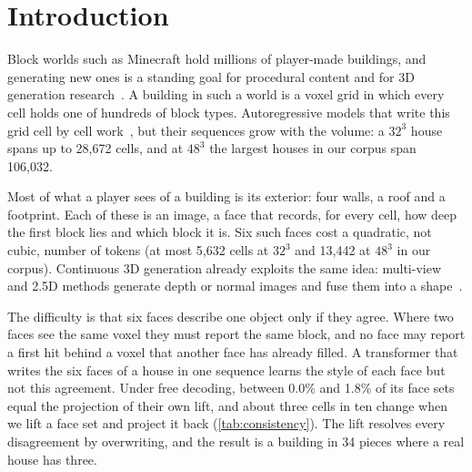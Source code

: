 \section{Introduction}
\label{sec:intro}

Block worlds such as Minecraft hold millions of player-made buildings, and generating new ones is a
standing goal for procedural content and for 3D generation research~\citep{salge2018gdmc,chen2019voxelcnn,merino2026dreamcubed}.
A building in such a world is a voxel grid in which every cell holds one of hundreds of block types.
Autoregressive models that write this grid cell by cell work~\citep{chen2019voxelcnn,merino2026dreamcubed},
but their sequences grow with the volume: a $32^3$ house spans up to 28{,}672 cells, and at $48^3$ the
largest houses in our corpus span 106{,}032.

Most of what a player sees of a building is its exterior: four walls, a roof and a footprint. Each of
these is an image, a face that records, for every cell, how deep the first block lies and which block
it is. Six such faces cost a quadratic, not cubic, number of tokens (at most 5{,}632 cells at $32^3$
and 13{,}442 at $48^3$ in our corpus). Continuous 3D generation already exploits the same idea:
multi-view and 2.5D methods generate depth or normal images and fuse them into a
shape~\citep{wang2024mvdd,lu2024direct25,long2024wonder3d,latents25d2025}.

The difficulty is that six faces describe one object only if they agree. Where two faces see the same
voxel they must report the same block, and no face may report a first hit behind a voxel that another
face has already filled. A transformer that writes the six faces of a house in one sequence learns the
style of each face but not this agreement. Under free decoding, between 0.0\% and 1.8\% of its face
sets equal the projection of their own lift, and about three cells in ten change when we lift a face
set and project it back (\cref{tab:consistency}). The lift resolves every disagreement by overwriting,
and the result is a building in 34 pieces where a real house has three.


